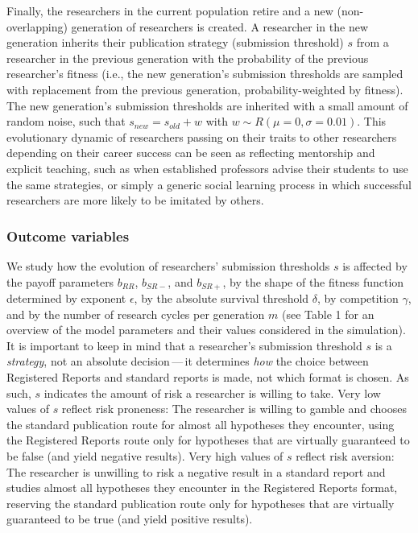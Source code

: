 \documentclass[british,,doc,mask,floatsintext]{apa6}
\begin{document}
Finally, the researchers in the current population retire and a new (non-overlapping) generation of researchers is created.
A researcher in the new generation inherits their publication strategy (submission threshold) \(s\) from a researcher in the previous generation with the probability of the previous researcher's fitness (i.e., the new generation's submission thresholds are sampled with replacement from the previous generation, probability-weighted by fitness).
The new generation's submission thresholds are inherited with a small amount of random noise, such that \(s_{new} = s_{old} + w\) with \(w \sim R(\mu = 0, \sigma = 0.01)\).
This evolutionary dynamic of researchers passing on their traits to other researchers depending on their career success can be seen as reflecting mentorship and explicit teaching, such as when established professors advise their students to use the same strategies, or simply a generic social learning process in which successful researchers are more likely to be imitated by others.

\hypertarget{outcome-variables}{%
\subsubsection{Outcome variables}\label{outcome-variables}}

We study how the evolution of researchers' submission thresholds \(s\) is affected by the payoff parameters \(b_{RR}\), \(b_{SR-}\), and \(b_{SR+}\), by the shape of the fitness function determined by exponent \(\epsilon\), by the absolute survival threshold \(\delta\), by competition \(\gamma\), and by the number of research cycles per generation \(m\) (see Table 1 for an overview of the model parameters and their values considered in the simulation).
It is important to keep in mind that a researcher's submission threshold \(s\) is a \emph{strategy}, not an absolute decision\(\,\)---\(\,\)it determines \emph{how} the choice between Registered Reports and standard reports is made, not which format is chosen.
As such, \(s\) indicates the amount of risk a researcher is willing to take.
Very low values of \(s\) reflect risk proneness:
The researcher is willing to gamble and chooses the standard publication route for almost all hypotheses they encounter, using the Registered Reports route only for hypotheses that are virtually guaranteed to be false (and yield negative results).
Very high values of \(s\) reflect risk aversion:
The researcher is unwilling to risk a negative result in a standard report and studies almost all hypotheses they encounter in the Registered Reports format, reserving the standard publication route only for hypotheses that are virtually guaranteed to be true (and yield positive results).
\end{document}

